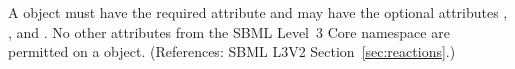 A \ModifierSpeciesReference object must have the required attribute
 and may have the optional attributes ,
,  and .  No other attributes from the
SBML Level~3 Core namespace are permitted on a \ModifierSpeciesReference
object.  (References: SBML L3V2 Section~\ref{sec:reactions}.)
